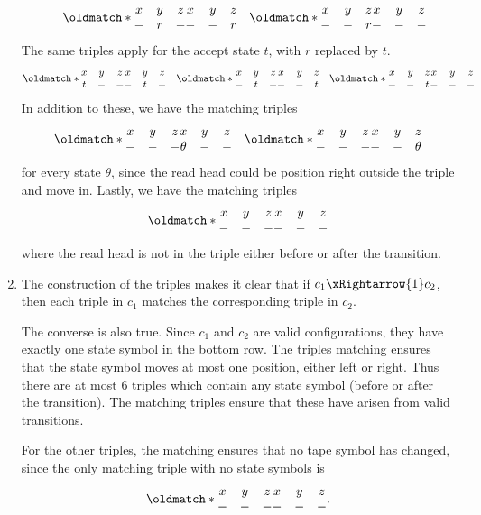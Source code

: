 \documentclass[12pt]{article}
\def\match{\oldmatch*}
\newcommand{\triple}[6]{%
    \begin{matrix}
        #1 & #2 & #3 \\
        #4 & #5 & #6 \\
    \end{matrix}%
}
\begin{document}
\begin{solution}
\begin{enumerate}[label=(\alph*)]
\begin{align*}
            && \match{\triple x y z -r-}{\triple x y z --r}
            && \match{\triple x y z --r}{\triple x y z ---}
        \end{align*} \normalsize
        The same triples apply for the accept state $t$, with $r$ replaced by $t$.
        \small \begin{align*}
            \match{\triple x y z t--}{\triple x y z -t-}
            && \match{\triple x y z -t-}{\triple x y z --t}
            && \match{\triple x y z --t}{\triple x y z ---}
        \end{align*}
        In addition to these, we have the matching triples \small \begin{align*}
            \match{\triple x y z ---}{\triple x y z \theta--}
            && \match{\triple x y z ---}{\triple x y z --\theta}
        \end{align*} \normalsize for every state $\theta$, since the read
        head could be position right outside the triple and move in.
        Lastly, we have the matching triples \small \begin{align*}
            \match{\triple x y z ---}{\triple x y z ---}
        \end{align*} \normalsize where the read head is not in the triple
        either before or after the transition.
        \item The construction of the triples makes it clear that if
        $c_1 \xRightarrow{1} c_2$, then each triple in $c_1$ matches the
        corresponding triple in $c_2$.

        The converse is also true.
        Since $c_1$ and $c_2$ are valid configurations, they have exactly
        one state symbol in the bottom row.
        The triples matching ensures that the state symbol moves at most
        one position, either left or right.
        Thus there are at most $6$ triples which contain any state symbol
        (before or after the transition).
        The matching triples ensure that these have arisen from valid
        transitions.

        For the other triples, the matching ensures that no tape symbol
        has changed, since the only matching triple with no state symbols
        is \[
            \match{\triple x y z ---}{\triple x y z ---}.
        \]


\end{enumerate}
\end{solution}
\end{document}
